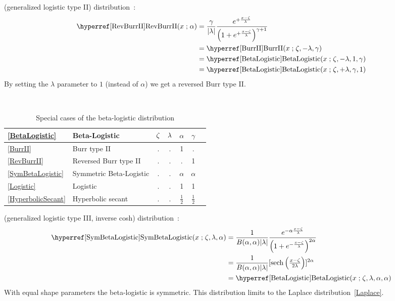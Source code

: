  (generalized logistic type II) distribution~\cite{Johnson1994}:
\begin{align}
\label{RevBurrII}
\opr{RevBurrII}(x\given \alpha) 
& = \frac{\gamma}{|\pScale|}   \frac{e^{+ \frac{x-\pLoc}{\pScale} } } { \left(1 + e^{+\frac{x-\pLoc}{\pScale}  }\right)^{\gamma+1} }
\checked
\\
& = \opr{BurrII}(x\given \pLoc, -\pScale,  \gamma) \notag \checked \\
& = \opr{BetaLogistic}(x\given \pLoc, -\pScale, 1, \gamma) \notag \checked \\
& = \opr{BetaLogistic}(x\given \pLoc, +\pScale, \gamma, 1)  \notag \checked
\notag
\end{align}
By setting the $\lambda$ parameter to $1$ (instead of $\alpha$) we get a reversed Burr type II.


\begin{table*}[ptb]
\begin{center}
\caption[Beta-logistic distribution -- Special cases]{Special cases of the beta-logistic distribution}
~\\
{\renewcommand{\arraystretch}{1.25} 
\begin{tabular}{llccccl}
\eqref{BetaLogistic} & Beta-Logistic & $\zeta$ & $\lambda$ & $\alpha$ &  $\gamma$ \\
\hline  
\eqref{BurrII} & Burr type II					&. & . & 1 & . & \\
\eqref{RevBurrII}& Reversed Burr type II		&	. & . & . & 1 &\\
\eqref{SymBetaLogistic}& Symmetric Beta-Logistic		&	. &   . & $\alpha$ & $\alpha$ & \\
\eqref{Logistic}& Logistic					& 	. & . & 1 & 1 & \\
\eqref{HyperbolicSecant}& Hyperbolic secant	&	. & . & $\tfrac{1}{2}$ & $\tfrac{1}{2}$ & \\
\end{tabular}
}
\end{center}
\end{table*}





 (generalized logistic type III, inverse cosh) distribution~\cite{Johnson1995}:
\begin{align}
\label{SymBetaLogistic}
\opr{SymBetaLogistic}(x\given \pLoc,\pScale,\alpha) 
& =
\frac{1}{B(\alpha, \alpha) |\pScale|}
 \frac{e^{-\alpha \frac{x-\pLoc}{\pScale} }} { \left(1 + e^{-\frac{x-\pLoc}{\pScale}  }\right)^{2\alpha} } \checked
  \\ \notag & = \frac{1}{B(\alpha, \alpha) |\pScale|} [\op{sech} \left(\tfrac{x-\pLoc}{2\pScale}  \right)]^{2\alpha}  
\\ \notag & = \opr{BetaLogistic}(x\given \pLoc,\pScale,\alpha,\alpha) \checked
\end{align}
With equal shape parameters the  beta-logistic is symmetric. This distribution limits to the Laplace distribution~\eqref{Laplace}.


